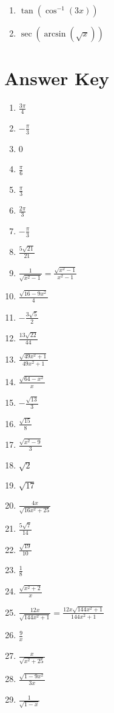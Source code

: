 \smallskip
\begin{multicols}{3}
\begin{enumerate}	\setcounter{enumi}{\value{Review}}
	\item $\tan\left(\cos^{-1}\left(3x\right)\right)$
    \item $\sec\left(\arcsin\left(\sqrt{x}\right)\right)$
\end{enumerate}	\setcounter{Review}{\value{enumi}}
\end{multicols}

\newpage

\section{Answer Key}

\begin{enumerate}
	\item $\frac{3\pi}{4}$
	\item $-\frac{\pi}{3}$
	\item 0
	\item $\frac{\pi}{6}$
	\item $\frac{\pi}{3}$
	\item $\frac{2\pi}{3}$
	\item $-\frac{\pi}{3}$
    \item $\frac{5\sqrt{21}}{21}$
    \item $\frac{1}{\sqrt{x^2-1}} = \frac{\sqrt{x^2-1}}{x^2-1}$
    \item $\frac{\sqrt{16-9x^2}}{4}$
    \item $-\frac{3\sqrt{5}}{2}$
    \item $\frac{13\sqrt{22}}{44}$
    \item $\frac{\sqrt{49x^2+1}}{49x^2+1}$
    \item $\frac{\sqrt{64-x^2}}{x}$
    \item $-\frac{\sqrt{13}}{3}$
    \item $\frac{\sqrt{15}}{8}$
    \item $\frac{\sqrt{x^2-9}}{3}$
    \item $\sqrt{2}$
    \item $\sqrt{17}$
    \item $\frac{4x}{\sqrt{16x^2+25}}$
    \item $\frac{5\sqrt{7}}{14}$
    \item $\frac{\sqrt{19}}{10}$
    \item $\frac{1}{8}$
    \item $\frac{\sqrt{x^2+2}}{x}$
    \item $\frac{12x}{\sqrt{144x^2+1}} = \frac{12x\sqrt{144x^2+1}}{144x^2+1}$
    \item $\frac{9}{x}$
    \item $\frac{x}{\sqrt{x^2+25}}$
    \item $\frac{\sqrt{1-9x^2}}{3x}$
    \item $\frac{1}{\sqrt{1-x}}$
\end{enumerate}
